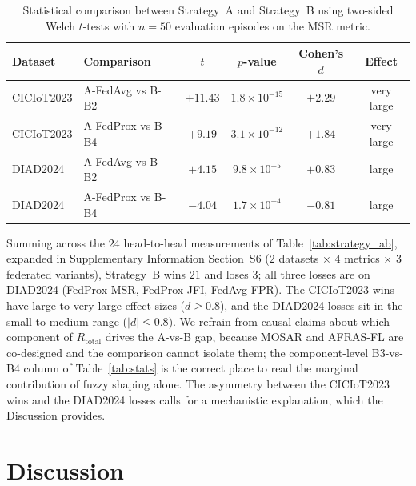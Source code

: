 \documentclass[journal]{IEEEtran}
\begin{document}
\begin{table}[!htbp]
  \centering
  \caption{Statistical comparison between Strategy~A and Strategy~B
  using two-sided Welch $t$-tests with $n = 50$ evaluation episodes on
  the MSR metric.}\label{tab:strategy_ab_stats}
  \small
  \begin{tabular}{@{}llcccc@{}}
    \toprule
    \textbf{Dataset} & \textbf{Comparison} & $t$ & $p$-value & \textbf{Cohen's $d$} & \textbf{Effect} \\
    \midrule
    CICIoT2023 & A-FedAvg  vs B-B2 & $+11.43$ & $1.8{\times}10^{-15}$ & $+2.29$ & very large \\
    CICIoT2023 & A-FedProx vs B-B4 & $+9.19$  & $3.1{\times}10^{-12}$ & $+1.84$ & very large \\
    DIAD2024   & A-FedAvg  vs B-B2 & $+4.15$  & $9.8{\times}10^{-5}$  & $+0.83$ & large \\
    DIAD2024   & A-FedProx vs B-B4 & $-4.04$  & $1.7{\times}10^{-4}$  & $-0.81$ & large \\
    \bottomrule
  \end{tabular}
\end{table}

Summing across the $24$ head-to-head measurements of
Table~\ref{tab:strategy_ab}, expanded in Supplementary Information
Section~S6 ($2$ datasets $\times$ $4$ metrics $\times$ $3$ federated
variants), Strategy~B wins $21$ and loses $3$; all three losses are
on DIAD2024 (FedProx MSR, FedProx JFI, FedAvg FPR). The CICIoT2023
wins have large to very-large effect sizes ($d \ge 0.8$), and the
DIAD2024 losses sit in the small-to-medium range ($|d| \le 0.8$). We
refrain from causal claims about which component of $R_{\text{total}}$
drives the A-vs-B gap, because MOSAR and AFRAS-FL are co-designed
and the comparison cannot isolate them; the component-level B3-vs-B4
column of Table~\ref{tab:stats} is the correct place to read the
marginal contribution of fuzzy shaping alone. The asymmetry between
the CICIoT2023 wins and the DIAD2024 losses calls for a mechanistic
explanation, which the Discussion provides.


\section{Discussion}\label{sec:discussion}
\end{document}
